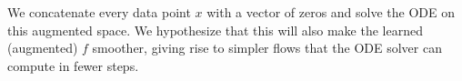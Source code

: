 \documentclass[book.tex]{subfiles}
\begin{document}
We concatenate every data point $x$ with a vector of zeros and solve the ODE on this augmented space. We hypothesize that this will also make the learned (augmented) $f$ smoother, giving rise to simpler flows that the ODE solver can compute in fewer steps. %




\end{document}
